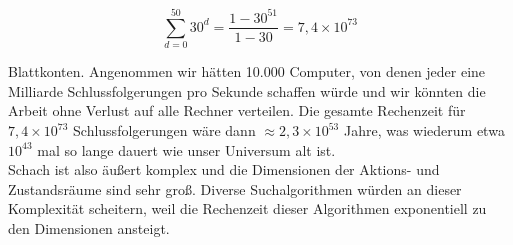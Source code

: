 \begin{equation}
\sum_{d=0}^{50} 30^{d} = \frac{1 - 30^{51}}{1 - 30} = 7,4 \times 10^{73}
\end{equation}

Blattkonten. Angenommen wir hätten 10.000 Computer, von denen jeder eine Milliarde Schlussfolgerungen pro Sekunde schaffen würde und wir könnten die Arbeit ohne Verlust auf alle Rechner verteilen. Die gesamte Rechenzeit für $7,4 \times 10^{73}$ Schlussfolgerungen wäre dann $\approx 2,3 \times 10^{53}$ Jahre, was wiederum etwa $10^{43}$ mal so lange dauert wie unser Universum alt ist\cite[93 \psq]{Ertel}. \\

Schach ist also äußert komplex und die Dimensionen der Aktions- und Zustandsräume sind sehr groß. Diverse Suchalgorithmen würden an dieser Komplexität scheitern, weil die Rechenzeit dieser Algorithmen exponentiell zu den Dimensionen ansteigt. 